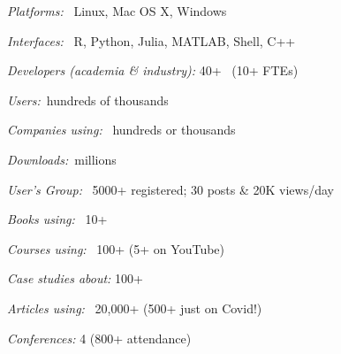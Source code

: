 \documentclass[9pt]{report}
\begin{document}
\begin{subitemize}
\item \textit{Platforms:} \ Linux, Mac OS X, Windows
  \vspace*{-4pt}
\item \textit{Interfaces:} \ R, Python, Julia, MATLAB, Shell, C++
  \vspace*{-4pt}
\item \textit{Developers (academia \& industry):} 40+ \ {\small (10+ FTEs)}
  \vspace*{-4pt}
\item \textit{Users:}\ hundreds of thousands
  \vspace*{-4pt}
\item \textit{Companies using:} \ hundreds or thousands
  \vspace*{-4pt}
\item \textit{Downloads:}\ millions
  \vspace*{-4pt}
\item \textit{User's Group:} \ 5000+ registered; 30 posts \& 20K views/day
  \vspace*{-4pt}
\item \textit{Books using:} \ 10+
  \vspace*{-4pt}
\item \textit{Courses using:} \ 100+ (5+ on YouTube)
  \vspace*{-4pt}
\item \textit{Case studies about:} 100+
  \vspace*{-4pt}
\item \textit{Articles using:} \ 20,000+ (500+ just on Covid!)
  \vspace*{-4pt}
\item \textit{Conferences:} 4 (800+ attendance)
\end{subitemize}
\end{document}
